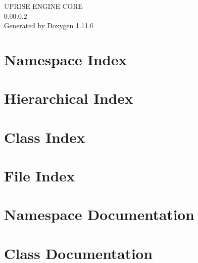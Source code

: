\documentclass[twoside]{book}
\newcommand{\+}{\discretionary{\mbox{\scriptsize$\hookleftarrow$}}{}{}}
\newcommand{\clearemptydoublepage}{%
    \newpage{\pagestyle{empty}\cleardoublepage}%
  }
\begin{document}
  \raggedbottom
    \hypersetup{pageanchor=false,
                bookmarksnumbered=true,
                pdfencoding=unicode
               }
  \begin{titlepage}
  \vspace*{7cm}
  \begin{center}%
  {\Large UPRISE ENGINE CORE}\\
  [1ex]\large 0.\+00.\+0.\+2 \\
  \vspace*{1cm}
  {\large Generated by Doxygen 1.11.0}\\
  \end{center}
  \end{titlepage}
  \clearemptydoublepage
  \tableofcontents
  \clearemptydoublepage
  \hypersetup{pageanchor=true}
\chapter{Namespace Index}

\chapter{Hierarchical Index}

\chapter{Class Index}

\chapter{File Index}

\chapter{Namespace Documentation}

\chapter{Class Documentation}













\end{document}
